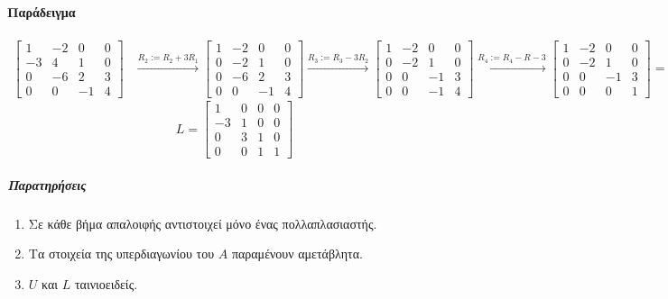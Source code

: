\documentclass[11pt,a4paper,notitlepage,fleqn]{article}
\begin{document}
\paragraph{Παράδειγμα}
\begin{align*}
	\left[\begin{matrix}
	1&-2&0&0\\-3&4&1&0\\0&-6&2&3\\0&0&-1&4
	\end{matrix}\right]
	&\xrightarrow{R_2:=R_2+3R_1}
	\left[\begin{matrix}
	1&-2&0&0\\0&-2&1&0\\0&-6&2&3\\0&0&-1&4
	\end{matrix}\right] \xrightarrow{R_3:=R_3-3R_2}\left[
	\begin{matrix}
	1&-2&0&0\\0&-2&1&0\\0&0&-1&3\\0&0&-1&4
	\end{matrix}
	\right]
	\xrightarrow{R_4:=R_4-R-3}\left[\begin{matrix}
	1&-2&0&0\\0&-2&1&0\\0&0&-1&3\\0&0&0&1
	\end{matrix}\right] = U
\end{align*}
\[
L=\left[\begin{matrix}
1&0&0&0\\-3&1&0&0\\0&3&1&0\\0&0&1&1
\end{matrix}\right]
\]
\subparagraph{Παρατηρήσεις}
\begin{enumerate}
	\item Σε κάθε βήμα απαλοιφής αντιστοιχεί μόνο ένας
	πολλαπλασιαστής.
	\item Τα στοιχεία της υπερδιαγωνίου του \( A \) παραμένουν
	αμετάβλητα.
	\item \( U \) και \( L \) ταινιοειδείς.
\end{enumerate}
\end{document}
